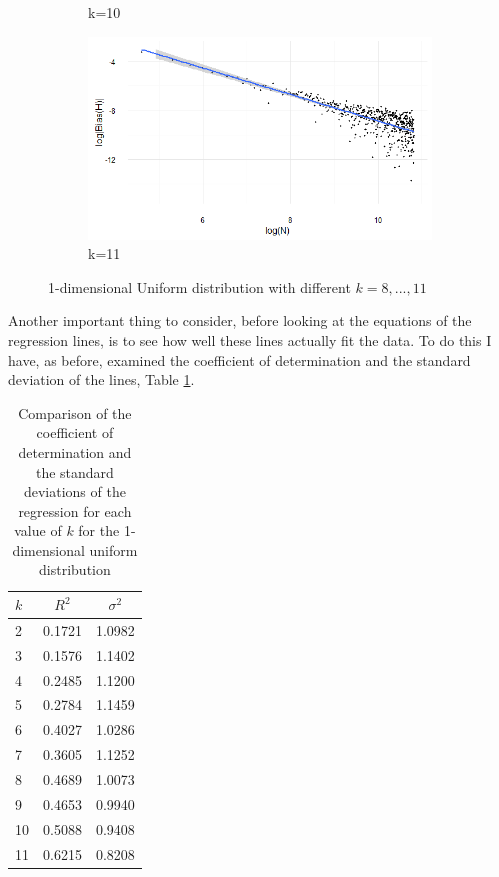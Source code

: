 \documentclass{report}
\begin{document}
\begin{figure}
{\begin{subfigure}[b]{.8\textwidth}
\caption{k=10}
\end{subfigure}%
\begin{subfigure}[b]{.8\textwidth}
\centering
\includegraphics[width=\textwidth]{./Graphs/Best/Uniform_k=11.png}
\caption{k=11}
\end{subfigure}%
}
\caption{1-dimensional Uniform distribution with different $k = 8, ...,11$} \label{Uniform_graphs811}
\end{figure}

Another important thing to consider, before looking at the equations of the regression lines, is to see how well these lines actually fit the data. To do this I have, as before, examined the coefficient of determination and the standard deviation of the lines, Table \ref{uniform_rsq}.

\begin{table}
\caption{Comparison of the coefficient of determination and the standard deviations of the regression for each value of $k$ for the 1-dimensional uniform distribution} \label{uniform_rsq}
\begin{center}
\begin{tabular}{| l | c c |} 
\toprule
$k$ & $R^2$ & $\sigma^2$ \\
\midrule[1pt]
2     & 0.1721    & 1.0982   \\
3     & 0.1576    & 1.1402   \\
4     & 0.2485    & 1.1200   \\
5     & 0.2784    & 1.1459   \\
6     & 0.4027    & 1.0286   \\
7     & 0.3605    & 1.1252   \\
8     & 0.4689    & 1.0073   \\
9     & 0.4653    & 0.9940   \\
10    & 0.5088    & 0.9408   \\
11    & 0.6215    & 0.8208   \\
\hline
\end{tabular}
\\[10pt]
\end{center}
\end{table}
\end{document}
